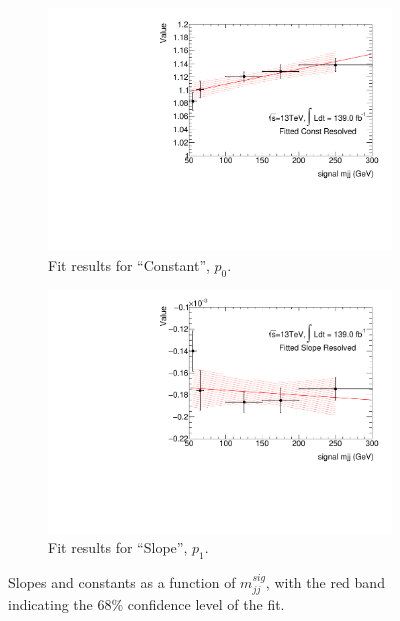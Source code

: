 \begin{figure}[ht]
    \centering
    \begin{subfigure}[b]{0.45\textwidth}
        \centering
        \includegraphics[width=\textwidth]{figures/mjjreweight1lep/fitCResMC16T.pdf}
        \caption{Fit results for ``Constant'', $p_0$.}
        \label{fig:fitCRes}
    \end{subfigure}
    \hfill
    \begin{subfigure}[b]{0.45\textwidth}
        \centering
        \includegraphics[width=\textwidth]{figures/mjjreweight1lep/fitSResMC16T.pdf}
        \caption{Fit results for ``Slope'', $p_1$.}
        \label{fig:fitSRes}
    \end{subfigure}
    \caption{Slopes and constants as a function of $m_{jj}^{sig}$, with the red band indicating the 68\% confidence level of the fit. 
}
    \label{fig:mjjReweight1LepResFit}
\end{figure}

